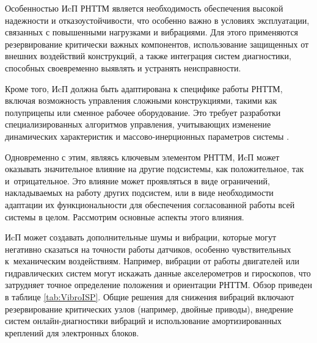 Особенностью ИcП РНТТМ является необходимость обеспечения высокой надежности и отказоустойчивости, что особенно важно в условиях эксплуатации, связанных с повышенными нагрузками и вибрациями. Для этого применяются резервирование критически важных компонентов, использование защищенных от внешних воздействий конструкций, а также интеграция систем диагностики, способных своевременно выявлять и устранять неисправности.

Кроме того, ИcП должна быть адаптирована к специфике работы РНТТМ, включая возможность управления сложными конструкциями, такими как полуприцепы или сменное рабочее оборудование. Это требует разработки специализированных алгоритмов управления, учитывающих изменение динамических характеристик и массово-инерционных параметров системы \cite{PevznerUgaiSulemanov2010}.

Одновременно с этим, являясь ключевым элементом РНТТМ, ИcП может оказывать значительное влияние на другие подсистемы, как положительное, так и~отрицательное. Это влияние может проявляться в виде ограничений, накладываемых на работу других подсистем, или в виде необходимости адаптации их функциональности для обеспечения согласованной работы всей системы в целом. Рассмотрим основные аспекты этого влияния.

ИcП может создавать дополнительные шумы и вибрации, которые могут негативно сказаться на точности работы датчиков, особенно чувствительных к~механическим воздействиям. Например, вибрации от работы двигателей или гидравлических систем могут искажать данные акселерометров и гироскопов, что затрудняет точное определение положения и ориентации РНТТМ. Обзор приведен в таблице \cref{tab:VibroISP}. Общие решения для снижения вибраций включают резервирование критических узлов (например, двойные приводы), внедрение систем онлайн-диагностики вибраций и использование амортизированных креплений для электронных блоков.

